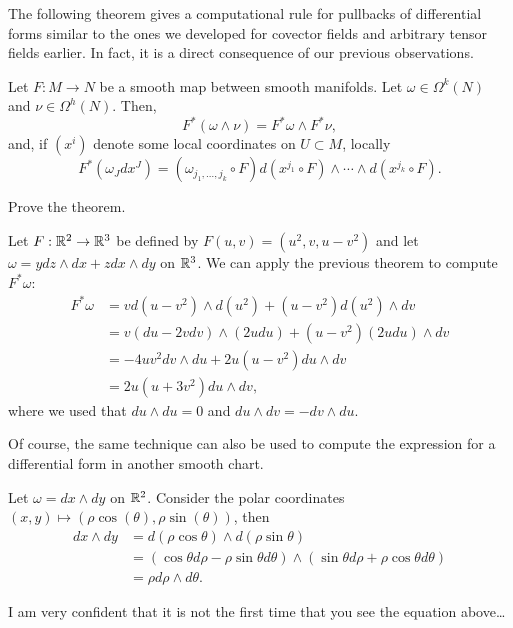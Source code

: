 The following theorem gives a computational rule for pullbacks of differential forms similar to the ones we developed for covector fields and arbitrary tensor fields earlier.
In fact, it is a direct consequence of our previous observations.

\begin{theorem}\label{thm:pullbacksdifferentialforms}
  Let $F: M\to N$ be a smooth map between smooth manifolds.
  Let $\omega\in\Omega^k(N)$ and $\nu\in\Omega^h(N)$.
  Then,
  \begin{equation}
    F^*(\omega\wedge\nu) = F^*\omega \wedge F^*\nu,
  \end{equation}
  and, if $(x^i)$ denote some local coordinates on $U\subset M$, locally
  \begin{equation}
    F^*\left(\omega_J dx^J\right) = (\omega_{j_1,\ldots, j_k}\circ F) d(x^{j_1}\circ F)\wedge\cdots\wedge d(x^{j_k}\circ F).
  \end{equation}
\end{theorem}
\begin{exercise}
  Prove the theorem.
\end{exercise}

\begin{example}
  Let $F:\mathbb{R}^2\to\mathbb{R}^3$ be defined by $F(u,v) = (u^2,v,u-v^2)$ and let $\omega = y dz\wedge dx + z dx\wedge dy$ on $\mathbb{R}^3$.
  We can apply the previous theorem to compute $F^*\omega$:
  \begin{align}
    F^*\omega & = v d(u-v^2)\wedge d(u^2) + (u-v^2) d(u^2)\wedge dv     \\
              & = v (du-2vdv)\wedge (2 u du) + (u-v^2) (2u du)\wedge dv \\
              & = -4uv^2 dv\wedge du + 2u(u-v^2) du\wedge dv            \\
              & = 2u (u + 3v^2) du \wedge dv,
  \end{align}
  where we used that $du\wedge du =0$ and $du\wedge dv = -dv\wedge du$.
\end{example}

Of course, the same technique can also be used to compute the expression for a differential form in another smooth chart.

\begin{example}
  Let $\omega = dx\wedge dy$ on $\mathbb{R}^2$.
  Consider the polar coordinates $(x,y)\mapsto (\rho\cos(\theta),\rho\sin(\theta))$, then
  \begin{align}
    dx\wedge dy & = d(\rho\cos\theta)\wedge d(\rho\sin\theta)                                                    \\
                & = (\cos\theta d\rho -\rho\sin\theta d\theta)\wedge (\sin\theta d\rho + \rho\cos\theta d\theta) \\
                & = \rho d\rho\wedge d\theta.
  \end{align}

  I am very confident that it is not the first time that you see the equation above\ldots
\end{example}

